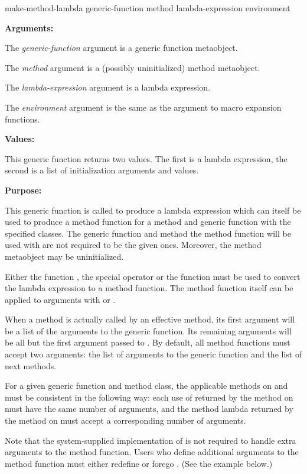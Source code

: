 \begin{defun}
make-method-lambda generic-function method lambda-expression environment

\textbf{Arguments:}

The \emph{generic-function} argument is a generic function metaobject.

The \emph{method} argument is a (possibly uninitialized) method metaobject.

The \emph{lambda-expression} argument is a lambda expression.

The \emph{environment} argument is the same as the  argument
to macro expansion functions.

\textbf{Values:}

This generic function returns two values. The first is a lambda expression, the
second is a list of initialization arguments and values.

\textbf{Purpose:}

This generic function is called to produce a lambda expression which can itself
be used to produce a method function for a method and generic function with the
specified classes. The generic function and method the method function will be
used with are not required to be the given ones. Moreover, the method metaobject
may be uninitialized.

Either the function , the special operator  or the
function  must be used to convert the lambda expression to a method
function. The method function itself can be applied to arguments with  or
.

When a method is actually called by an effective method, its first argument will
be a list of the arguments to the generic function. Its remaining arguments will
be all but the first argument passed to . By default, all
method functions must accept two arguments: the list of arguments to the generic
function and the list of next methods.

For a given generic function and method class, the applicable methods on
 and  must be consistent
in the following way: each use of  returned by the method on
 must have the same number of arguments, and the
method lambda returned by the method on  must accept a
corresponding number of arguments.

Note that the system-supplied implementation of  is not
required to handle extra arguments to the method function. Users who define
additional arguments to the method function must either redefine or forego
. (See the example below.)


\end{defun}
